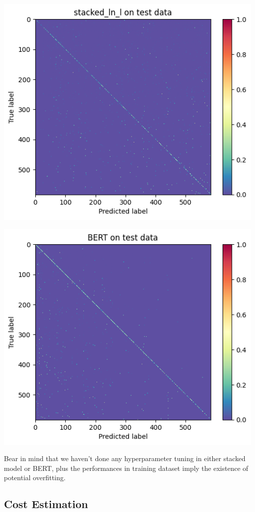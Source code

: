 \documentclass[
]{kaohandt}
\begin{document}
\includegraphics{confusion_matrix_stacked_ln_l_test}

\includegraphics{confusion_matrix_bert_test}

Bear in mind that we haven’t done any hyperparameter tuning in either stacked model or BERT, plus the performances in training dataset imply the existence of potential overfitting.

\subsection*{Cost Estimation}
\end{document}
